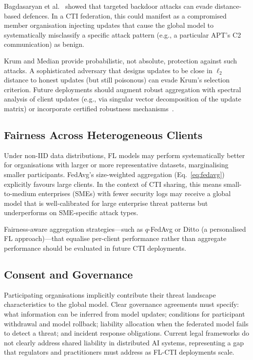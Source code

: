 \documentclass[conference]{IEEEtran}
\begin{document}
Bagdasaryan et al.~\cite{bagdasaryan2020} showed that targeted
backdoor attacks can evade distance-based defences.
In a CTI federation, this could manifest as a compromised member
organisation injecting updates that cause the global model to
systematically misclassify a specific attack pattern (e.g., a
particular APT's C2 communication) as benign.

Krum and Median provide probabilistic, not absolute, protection
against such attacks.
A sophisticated adversary that designs updates to be close in
$\ell_2$ distance to honest updates (but still poisonous) can evade
Krum's selection criterion.
Future deployments should augment robust aggregation with spectral
analysis of client updates (e.g., via singular vector decomposition
of the update matrix) or incorporate certified robustness
mechanisms~\cite{blanchard2017}.

\subsection{Fairness Across Heterogeneous Clients}

Under non-IID data distributions, FL models may perform systematically
better for organisations with larger or more representative datasets,
marginalising smaller participants.
FedAvg's size-weighted aggregation (Eq.~\ref{eq:fedavg}) explicitly
favours large clients.
In the context of CTI sharing, this means small-to-medium enterprises
(SMEs) with fewer security logs may receive a global model that
is well-calibrated for large enterprise threat patterns but
underperforms on SME-specific attack types.

Fairness-aware aggregation strategies---such as $q$-FedAvg or
Ditto (a personalised FL approach)---that equalise per-client
performance rather than aggregate performance should be evaluated
in future CTI deployments.

\subsection{Consent and Governance}

Participating organisations implicitly contribute their threat landscape
characteristics to the global model.
Clear governance agreements must specify: what information can be
inferred from model updates; conditions for participant withdrawal and
model rollback; liability allocation when the federated model fails to
detect a threat; and incident response obligations.
Current legal frameworks do not clearly address shared liability in
distributed AI systems, representing a gap that regulators and
practitioners must address as FL-CTI deployments scale.
\end{document}
